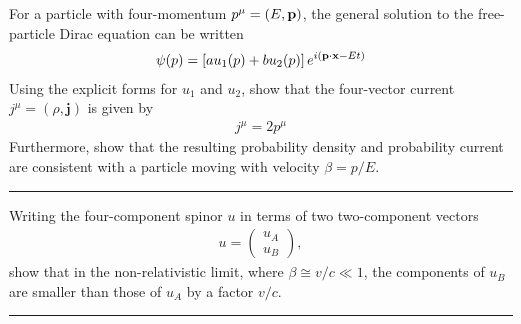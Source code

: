 
\begin{problem}{4.4}
For a particle with four-momentum $p^\mu = (E,\mathbf{p})$, the general solution to the free-particle Dirac equation can be written
\begin{align*}
    \psi(p) = \left[ au_1(p)+bu_2(p) \right] e^{i\left( \mathbf{p}\cdot\mathbf{x} - Et \right)}
\end{align*}
Using the explicit forms for $u_1$ and $u_2$, show that the four-vector current $j^\mu=(\rho,\mathbf{j})$ is given by
\begin{align*}
    j^\mu = 2 p^\mu
\end{align*}
Furthermore, show that the resulting probability density and probability current are consistent with a particle
moving with velocity $\beta = p /E$.
\end{problem}
\begin{solution}

\end{solution}

\noindent\rule{7in}{1.5pt}


\begin{problem}{4.5}
Writing the four-component spinor $u$ in terms of two two-component vectors
\begin{align*}
    u = \begin{pmatrix}
        u_A \\
        u_B
    \end{pmatrix},
\end{align*}
show that in the non-relativistic limit, where $\beta \cong v/c \ll 1$, the components of $u_B$ are smaller than those of $u_A$ by a factor $v/c$.
\end{problem}
\begin{solution}

\end{solution}

\noindent\rule{7in}{1.5pt}


